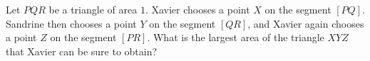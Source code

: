 Let $PQR$ be a triangle of area $1$. Xavier chooses a point $X$ on the segment $[PQ]$. Sandrine then chooses a point $Y$ on the segment $[QR]$, and Xavier again chooses a point $Z$ on the segment $[PR]$. What is the largest area of the triangle $XYZ$ that Xavier can be sure to obtain?

